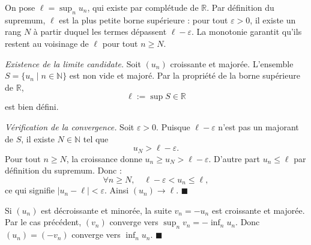 \begin{ideepreuve}
On pose $\ell = \sup_n u_n$, qui existe par complétude de $\mathbb{R}$.
Par définition du supremum, $\ell$ est la plus petite borne supérieure : pour
tout $\varepsilon > 0$, il existe un rang $N$ à partir duquel les termes
dépassent $\ell - \varepsilon$. La monotonie garantit qu'ils restent au
voisinage de $\ell$ pour tout $n \geq N$.
\end{ideepreuve}

\vspace{10pt}

\begin{mdframed}[style=proofbar]
  \textit{Existence de la limite candidate.}
  Soit $(u_n)$ croissante et majorée. L'ensemble
  $S = \{u_n \mid n \in \mathbb{N}\}$ est non vide et majoré.
  Par la propriété de la borne supérieure de $\mathbb{R}$,
  \[
    \ell := \sup S \in \mathbb{R}
  \]
  est bien défini.

  \medskip
  \textit{Vérification de la convergence.}
  Soit $\varepsilon > 0$. Puisque $\ell - \varepsilon$ n'est pas un majorant
  de $S$, il existe $N \in \mathbb{N}$ tel que
  \[
    u_N > \ell - \varepsilon.
  \]
  Pour tout $n \geq N$, la croissance donne $u_n \geq u_N > \ell - \varepsilon$.
  D'autre part $u_n \leq \ell$ par définition du supremum. Donc :
  \[
    \forall n \geq N, \quad \ell - \varepsilon < u_n \leq \ell,
  \]
  ce qui signifie $|u_n - \ell| < \varepsilon$. Ainsi $(u_n) \to \ell$.
  \hfill$\blacksquare$
\end{mdframed}


\begin{mdframed}[style=proofbar]
  Si $(u_n)$ est décroissante et minorée, la suite $v_n = -u_n$ est croissante
  et majorée. Par le cas précédent, $(v_n)$ converge vers $\sup_n v_n =
  -\inf_n u_n$. Donc $(u_n) = (-v_n)$ converge vers $\inf_n u_n$.
  \hfill$\blacksquare$
\end{mdframed}


